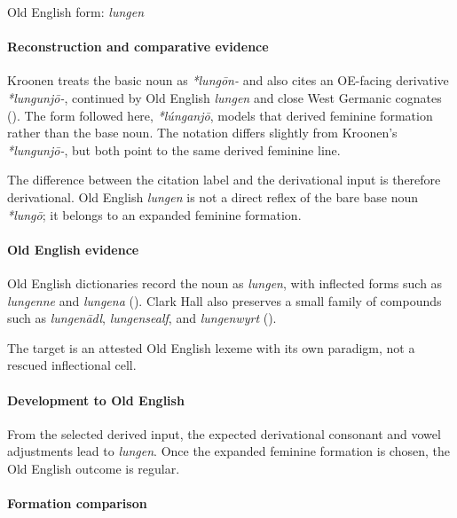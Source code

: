 \documentclass[
  british,
  a4paper,
]{article}
\begin{document}
Old English form: \emph{lungen}

\paragraph{Reconstruction and comparative
evidence}\label{reconstruction-and-comparative-evidence-18}

Kroonen treats the basic noun as \emph{*lungōn-} and also cites an
OE-facing derivative \emph{*lungunjō-}, continued by Old English
\emph{lungen} and close West Germanic cognates
(). The form followed here,
\emph{*lúnganjō}, models that derived feminine formation rather than the
base noun. The notation differs slightly from Kroonen's
\emph{*lungunjō-}, but both point to the same derived feminine line.

The difference between the citation label and the derivational input is
therefore derivational. Old English \emph{lungen} is not a direct reflex
of the bare base noun \emph{*lungō}; it belongs to an expanded feminine
formation.

\paragraph{Old English evidence}\label{old-english-evidence-18}

Old English dictionaries record the noun as \emph{lungen}, with
inflected forms such as \emph{lungenne} and \emph{lungena}
().
Clark Hall also preserves a small family of compounds such as
\emph{lungenādl}, \emph{lungensealf}, and \emph{lungenwyrt}
().

The target is an attested Old English lexeme with its own paradigm, not
a rescued inflectional cell.

\paragraph{Development to Old
English}\label{development-to-old-english-18}

From the selected derived input, the expected derivational consonant and
vowel adjustments lead to \emph{lungen}. Once the expanded feminine
formation is chosen, the Old English outcome is regular.

\paragraph{Formation comparison}\label{formation-comparison-3}
\end{document}
